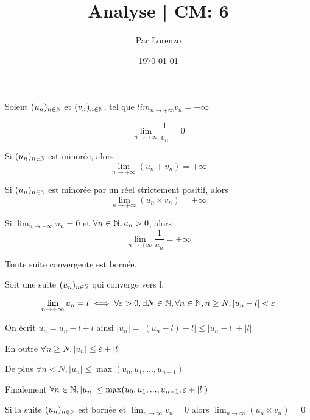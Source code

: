 \documentclass[a4paper, 12pt]{article}
\title{Analyse | CM: 6}
\author{Par Lorenzo}
\date{\today}
\begin{document}
\maketitle

\begin{proprietes}
    Soient $(u_n)_{n \in \mathbb{N}}$ et $(v_n)_{n \in \mathbb{N}}$, tel que $lim_{n \to +\infty}v_n = +\infty$
    
    \item $$
    \lim_{n \to +\infty}\frac{1}{v_n} = 0
    $$

    \item Si $(u_n)_{n \in \mathbb{N}}$ est minorée, alors
    $$
    \lim_{n \to +\infty}(u_n + v_n) = +\infty
    $$

    \item Si $(u_n)_{n \in \mathbb{N}}$ est minorée par un réel strictement positif, alors
    $$
    \lim_{n \to +\infty}(u_n \times v_n) = +\infty
    $$

    \item Si $\lim_{n \to +\infty} u_n = 0$ et $\forall n \in \mathbb{N}, u_n > 0$, alors
    $$
    \lim_{n \to +\infty}\frac{1}{u_n} = +\infty
    $$
\end{proprietes}

\begin{theorem}
    Toute suite convergente est bornée.
\end{theorem}

\begin{demonstration}
    Soit une suite $(u_n)_{n \in \mathbb{N}}$ qui converge vers l.

    $$
    \lim_{n \to +\infty}u_n = l \iff \forall \varepsilon > 0, \exists N \in \mathbb{N}, \forall n \in \mathbb{N}, n \geq N, |u_n - l| < \varepsilon
    $$

    On écrit $u_n = u_n - l + l$ ainsi $|u_n| = |(u_n - l) + l| \leq |u_n - l| + |l|$

    En outre $\forall n \geq N, |u_n| \leq \varepsilon + |l|$

    De plus $\forall n \lt N, |u_n| \leq \max(u_0, u_1, ..., u_{n-1})$

    \begin{rdem}
        Finalement $\forall n \in \mathbb{N}, |u_n| \leq \max(u_0, u_1, ..., u_{n-1}, \varepsilon + |l|)$
    \end{rdem}
\end{demonstration}

\begin{corollaire}
    Si la suite $(u_n)_{n \in \mathbb{N}}$ est bornée et $\lim_{n \to \infty} v_n = 0$ alors $\lim_{n \to \infty} (u_n \times v_n) = 0$
\end{corollaire}
\end{document}
